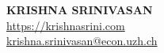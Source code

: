 \documentclass{resume} %
\begin{document}
\begin{center}
  \textbf{\MakeUppercase{krishna srinivasan}} \\
  \href{https://www.krishnasrini.com}{https://krishnasrini.com} \\
  \href{krishna.srinivasan@econ.uzh.ch}{krishna.srinivasan@econ.uzh.ch}
\end{center}







\end{document}
